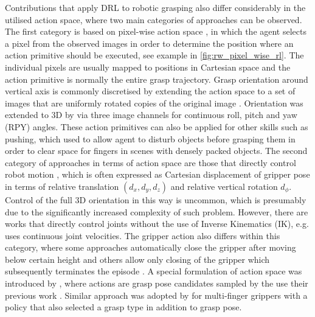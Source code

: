 Contributions that apply DRL to robotic grasping also differ considerably in the utilised action space, where two main categories of approaches can be observed. The first category is based on pixel-wise action space \cite{zeng_learning_2018, gualtieri_learning_2018, liu_active_2019, daniel_deep_2020, wu_generative_2020}, in which the agent selects a pixel from the observed images in order to determine the position where an action primitive should be executed, see example in \autoref{fig:rw_pixel_wise_rl}. The individual pixels are usually mapped to positions in Cartesian space and the action primitive is normally the entire grasp trajectory. Grasp orientation around vertical axis is commonly discretised by extending the action space to a set of images that are uniformly rotated copies of the original image \cite{zeng_learning_2018, daniel_deep_2020}. Orientation was extended to 3D by \citet{wu_generative_2020} via three image channels for continuous roll, pitch and yaw (RPY) angles. These action primitives can also be applied for other skills such as pushing, which \citet{zeng_learning_2018} used to allow agent to disturb objects before grasping them in order to clear space for fingers in scenes with densely packed objects. The second category of approaches in terms of action space are those that directly control robot motion \cite{quillen_deep_2018, kalashnikov_qt-opt_2018, breyer_comparing_2019, joshi_robotic_2020, zhan_framework_2020, kim_acceleration_2020, iqbal_toward_2020}, which is often expressed as Cartesian displacement of gripper pose in terms of relative translation $(d_x, d_y, d_z)$ and relative vertical rotation $d_\phi$. Control of the full 3D orientation in this way is uncommon, which is presumably due to the significantly increased complexity of such problem. However, there are works that directly control joints without the use of Inverse Kinematics (IK), e.g. \citet{popov_data-efficient_2017} uses continuous joint velocities. The gripper action also differs within this category, where some approaches automatically close the gripper after moving below certain height \cite{quillen_deep_2018} and others allow only closing of the gripper which subsequently terminates the episode \cite{kalashnikov_qt-opt_2018, joshi_robotic_2020}. A special formulation of action space was introduced by \citet{gualtieri_pick_2018}, where actions are grasp pose candidates sampled by the use their previous work \citet{ten_pas_grasp_2017}. Similar approach was adopted by \citet{osa_experiments_2017} for multi-finger grippers with a policy that also selected a grasp type in addition to grasp pose.

